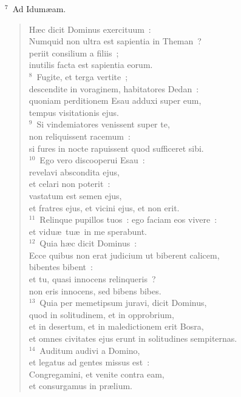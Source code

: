 ${}^{7}$~Ad Idum\ae am. \begin{flushleft}\begin{verse}H\ae c dicit Dominus exercituum~:\\ Numquid non ultra est sapientia in Theman~?\\ periit consilium a filiis~;\\ inutilis facta est sapientia eorum.\\
${}^{8}$~Fugite, et terga vertite~;\\ descendite in voraginem, habitatores Dedan~:\\ quoniam perditionem Esau adduxi super eum,\\ tempus visitationis ejus.\\
${}^{9}$~Si vindemiatores venissent super te,\\ non reliquissent racemum~:\\ si fures in nocte rapuissent quod sufficeret sibi.\\
${}^{10}$~Ego vero discooperui Esau~:\\ revelavi abscondita ejus,\\ et celari non poterit~:\\ vastatum est semen ejus,\\ et fratres ejus, et vicini ejus, et non erit.\\
${}^{11}$~Relinque pupillos tuos~: ego faciam eos vivere~:\\ et vidu\ae\ tu\ae\ in me sperabunt.\\
${}^{12}$~Quia h\ae c dicit Dominus~:\\ Ecce quibus non erat judicium ut biberent calicem,\\ bibentes bibent~:\\ et tu, quasi innocens relinqueris~?\\ non eris innocens, sed bibens bibes.\\
${}^{13}$~Quia per memetipsum juravi, dicit Dominus,\\ quod in solitudinem, et in opprobrium,\\ et in desertum, et in maledictionem erit Bosra,\\ et omnes civitates ejus erunt in solitudines sempiternas.\\
${}^{14}$~Auditum audivi a Domino,\\ et legatus ad gentes missus est~:\\ Congregamini, et venite contra eam,\\ et consurgamus in pr\ae lium.\\

\end{verse}
\end{flushleft}
